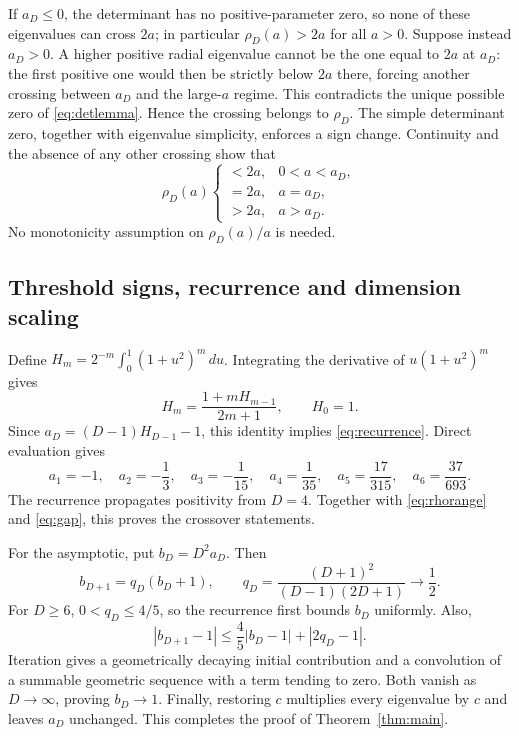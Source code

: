\documentclass[11pt,a4paper]{article}
\begin{document}
If $a_D\leq0$, the determinant has no positive-parameter zero, so none
of these eigenvalues can cross $2a$; in particular $\rho_D(a)>2a$
for all $a>0$. Suppose instead $a_D>0$. A higher positive radial
eigenvalue cannot be the one equal to $2a$ at $a_D$: the first positive
one would then be strictly below $2a$ there, forcing another crossing
between $a_D$ and the large-$a$ regime. This contradicts the unique
possible zero of \eqref{eq:detlemma}. Hence the crossing belongs to
$\rho_D$. The simple determinant zero, together with eigenvalue
simplicity, enforces a sign change. Continuity and the absence of any
other crossing show that
\begin{equation}\label{eq:rhorange}
 \rho_D(a)\begin{cases}
 <2a,&0<a<a_D,\\
 =2a,&a=a_D,\\
 >2a,&a>a_D.
 \end{cases}
\end{equation}
No monotonicity assumption on $\rho_D(a)/a$ is needed.

\subsection{Threshold signs, recurrence and dimension scaling}
Define $H_m=2^{-m}\int_0^1(1+u^2)^m\,du$. Integrating the derivative
of $u(1+u^2)^m$ gives
\begin{equation}\label{eq:Hrecurrence}
 H_m=\frac{1+mH_{m-1}}{2m+1},\qquad H_0=1.
\end{equation}
Since $a_D=(D-1)H_{D-1}-1$, this identity implies
\eqref{eq:recurrence}. Direct evaluation gives
\begin{equation}\label{eq:values}
 a_1=-1,\quad a_2=-\frac13,\quad a_3=-\frac1{15},\quad
 a_4=\frac1{35},\quad a_5=\frac{17}{315},\quad a_6=\frac{37}{693}.
\end{equation}
The recurrence propagates positivity from $D=4$. Together with
\eqref{eq:rhorange} and \eqref{eq:gap}, this proves the crossover
statements.

For the asymptotic, put $b_D=D^2a_D$. Then
\begin{equation}\label{eq:brecurrence}
 b_{D+1}=q_D(b_D+1),\qquad
 q_D=\frac{(D+1)^2}{(D-1)(2D+1)}\longrightarrow\frac12.
\end{equation}
For $D\geq6$, $0<q_D\leq4/5$, so the recurrence first bounds $b_D$
uniformly. Also,
\begin{equation}
 |b_{D+1}-1|\leq\frac45|b_D-1|+|2q_D-1|.
\end{equation}
Iteration gives a geometrically decaying initial contribution and a
convolution of a summable geometric sequence with a term tending to
zero. Both vanish as $D\to\infty$, proving $b_D\to1$.
Finally, restoring $c$ multiplies every eigenvalue by $c$ and leaves
$a_D$ unchanged. This completes the proof of Theorem~\ref{thm:main}.
\end{document}
